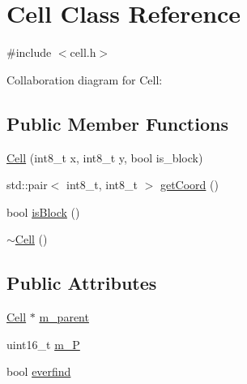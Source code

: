 \hypertarget{class_cell}{\section{Cell Class Reference}
\label{class_cell}
}


{\ttfamily \#include $<$cell.\-h$>$}



Collaboration diagram for Cell\-:
\subsection*{Public Member Functions}
\begin{DoxyCompactItemize}
\item 
\hyperlink{class_cell_aa773f7eb4e9ae0985291bf5332570f37}{Cell} (int8\-\_\-t x, int8\-\_\-t y, bool is\-\_\-block)
\item 
std\-::pair$<$ int8\-\_\-t, int8\-\_\-t $>$ \hyperlink{class_cell_a6cb8051b31ce00b7a7f2cc1b6e14d6a4}{get\-Coord} ()
\item 
bool \hyperlink{class_cell_aa7cf3f2e7c09c75764d8934d530c4863}{is\-Block} ()
\item 
\hyperlink{class_cell_a9fa559f7a28e2b4336c6879ca09304d8}{$\sim$\-Cell} ()
\end{DoxyCompactItemize}
\subsection*{Public Attributes}
\begin{DoxyCompactItemize}
\item 
\hyperlink{class_cell}{Cell} $\ast$ \hyperlink{class_cell_a1d30ec2a94e3ba2bec541d978f55c9bc}{m\-\_\-parent}
\item 
uint16\-\_\-t \hyperlink{class_cell_aa47b258f5356e76a577a5035b6e1cf59}{m\-\_\-\-P}
\item 
bool \hyperlink{class_cell_a1c2a62d76f46eb90b5d128fe30286e51}{everfind}
\end{DoxyCompactItemize}


